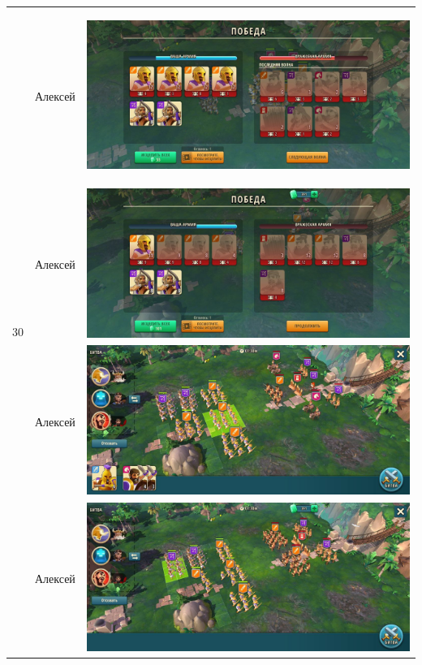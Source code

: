 \begin{longtable}{|c|c|c|}
	\hline
	\multirow{15}{*}{30} & Алексей &
	\hypertarget{fight30}{\includegraphics[width=0.75\linewidth]{./parts/media/TreasureHunt/30/alexey/photo_2022-04-14_12-36-02.jpg}} \\
	& Алексей &
	\includegraphics[width=0.75\linewidth]{./parts/media/TreasureHunt/30/alexey/photo_2022-04-14_12-35-50.jpg} \\
	& Алексей &
	\includegraphics[width=0.75\linewidth]{./parts/media/TreasureHunt/30/alexey/photo_2022-04-14_12-36-06.jpg} \\
	& Алексей &
	\includegraphics[width=0.75\linewidth]{./parts/media/TreasureHunt/30/alexey/photo_2022-04-14_12-35-59.jpg} \\

\end{longtable}
